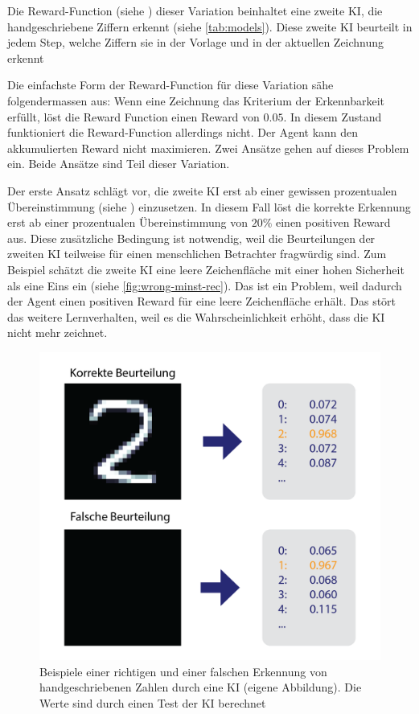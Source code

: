 Die Reward-Function (siehe ) dieser Variation beinhaltet
eine zweite KI, die handgeschriebene Ziffern erkennt (siehe
\autoref{tab:models}). Diese zweite KI beurteilt in jedem Step, welche
Ziffern sie in der Vorlage und in der aktuellen  %
Zeichnung erkennt

Die einfachste Form der Reward-Function für diese Variation sähe
folgendermassen aus: Wenn eine Zeichnung das Kriterium der Erkennbarkeit
erfüllt, löst die Reward Function einen Reward von $0.05$. In diesem Zustand
funktioniert die Reward-Function allerdings nicht. Der Agent kann den
akkumulierten Reward nicht maximieren. Zwei Ansätze gehen auf dieses Problem
ein. Beide Ansätze sind Teil dieser Variation.

Der erste Ansatz schlägt vor, die zweite KI erst ab einer gewissen prozentualen
Übereinstimmung (siehe ) einzusetzen. In diesem Fall
löst die korrekte Erkennung erst ab einer prozentualen Übereinstimmung von
$20\%$ einen positiven Reward aus. Diese zusätzliche Bedingung ist notwendig,
weil die Beurteilungen der zweiten KI teilweise für einen menschlichen
Betrachter fragwürdig sind. Zum Beispiel schätzt die zweite KI eine leere
Zeichenfläche mit einer hohen Sicherheit als eine Eins ein (siehe
\autoref{fig:wrong-minst-rec}). Das ist ein Problem, weil dadurch der Agent
einen positiven Reward für eine leere Zeichenfläche erhält. Das stört das
weitere Lernverhalten, weil es die Wahrscheinlichkeit erhöht, dass die KI nicht
mehr zeichnet.

\begin{figure}[!ht]
  \centering
  \includegraphics[width=\textwidth]{images/methode/wrong-mnist-rec.png}
  \caption{Beispiele einer richtigen und einer falschen Erkennung von handgeschriebenen Zahlen durch eine KI (eigene Abbildung). Die Werte sind durch einen Test der KI berechnet }
  \label{fig:wrong-minst-rec}
\end{figure}


